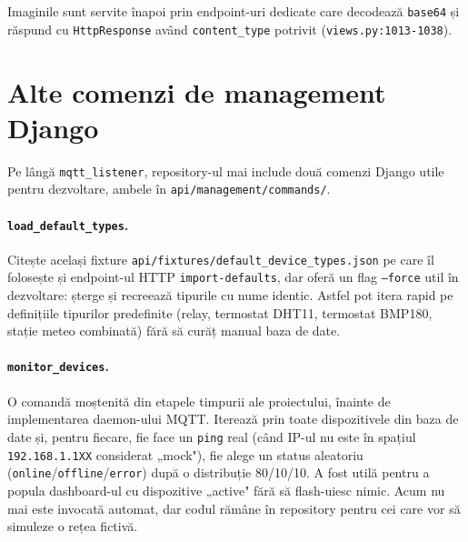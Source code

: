 Imaginile sunt servite înapoi prin endpoint-uri dedicate care decodează \texttt{base64} și răspund cu \texttt{HttpResponse} având \texttt{content\_type} potrivit (\texttt{views.py:1013-1038}).

\section{Alte comenzi de management Django}
Pe lângă \texttt{mqtt\_listener}, repository-ul mai include două comenzi Django utile pentru dezvoltare, ambele în \texttt{api/management/commands/}.

\paragraph{\texttt{load\_default\_types}.} Citește același fixture \texttt{api/fixtures/default\_device\_types.json} pe care îl folosește și endpoint-ul HTTP \texttt{import-defaults}, dar oferă un flag \texttt{--force} util în dezvoltare: șterge și recreează tipurile cu nume identic. Astfel pot itera rapid pe definițiile tipurilor predefinite (relay, termostat DHT11, termostat BMP180, stație meteo combinată) fără să curăț manual baza de date.

\paragraph{\texttt{monitor\_devices}.} O comandă moștenită din etapele timpurii ale proiectului, înainte de implementarea daemon-ului MQTT. Iterează prin toate dispozitivele din baza de date și, pentru fiecare, fie face un \texttt{ping} real (când IP-ul nu este în spațiul \texttt{192.168.1.1XX} considerat „mock"), fie alege un status aleatoriu (\texttt{online}/\texttt{offline}/\texttt{error}) după o distribuție 80/10/10. A fost utilă pentru a popula dashboard-ul cu dispozitive „active" fără să flash-uiesc nimic. Acum nu mai este invocată automat, dar codul rămâne în repository pentru cei care vor să simuleze o rețea fictivă.

